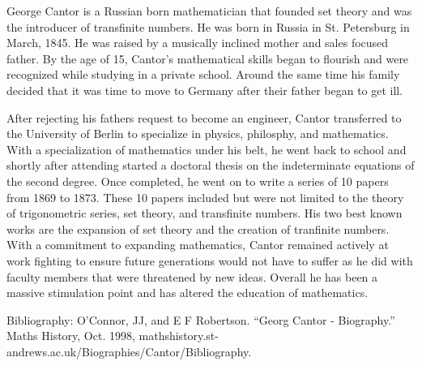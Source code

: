 \documentclass{article}
\begin{document}

George Cantor is a Russian born mathematician that founded set theory and was the introducer of transfinite numbers. He was born in Russia in St. Petersburg in March, 1845. He was raised by a musically inclined mother and sales focused father. By the age of 15, Cantor's mathematical skills began to flourish and were recognized while studying in a private school. Around the same time his family decided that it was time to move to Germany after their father began to get ill.

After rejecting his fathers request to become an engineer, Cantor transferred to the University of Berlin to specialize in physics, philosphy, and mathematics. With a specialization of mathematics under his belt, he went back to school and shortly after attending started a doctoral thesis on the indeterminate equations of the second degree. Once completed, he went on to write a series of 10 papers from 1869 to 1873. These 10 papers included but were not limited to the theory of trigonometric series, set theory, and transfinite numbers. His two best known works are the expansion of set theory and the creation of tranfinite numbers. With a commitment to expanding mathematics, Cantor remained actively at work fighting to ensure future generations would not have to suffer as he did with faculty members that were threatened by new ideas. Overall he has been a massive stimulation point and has altered the education of mathematics.
 
Bibliography: O'Connor, JJ, and E F Robertson. “Georg Cantor - Biography.” Maths History, Oct. 1998, mathshistory.st-andrews.ac.uk/Biographies/Cantor/Bibliography. 

\end{document}
